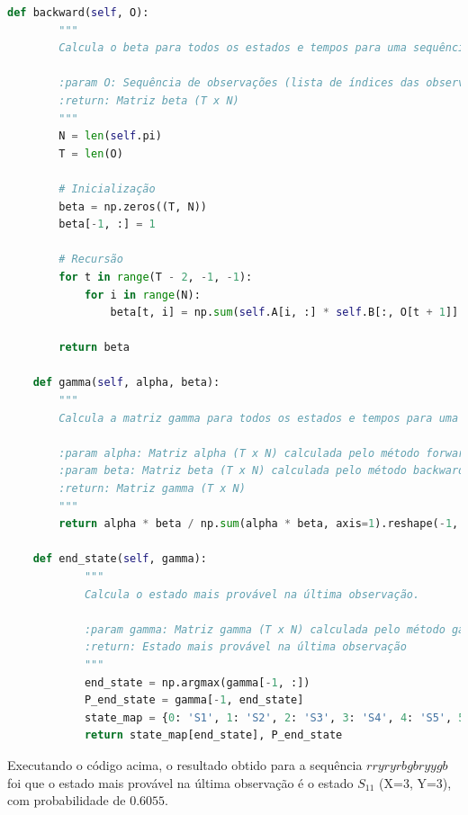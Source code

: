 \begin{itemize}
\begin{tcolorbox}[title=Resposta:]
    \end{tcolorbox}    
    
    \begin{lstlisting}[language=Python, caption={backward, gamma e end\_state}, label={lst:end_state}]
    def backward(self, O):
        """
        Calcula o beta para todos os estados e tempos para uma sequência O.

        :param O: Sequência de observações (lista de índices das observações)
        :return: Matriz beta (T x N)
        """
        N = len(self.pi)
        T = len(O)

        # Inicialização
        beta = np.zeros((T, N))
        beta[-1, :] = 1

        # Recursão
        for t in range(T - 2, -1, -1):
            for i in range(N):
                beta[t, i] = np.sum(self.A[i, :] * self.B[:, O[t + 1]] * beta[t + 1, :])

        return beta
    
    def gamma(self, alpha, beta):
        """
        Calcula a matriz gamma para todos os estados e tempos para uma sequência O.
        
        :param alpha: Matriz alpha (T x N) calculada pelo método forward
        :param beta: Matriz beta (T x N) calculada pelo método backward
        :return: Matriz gamma (T x N)
        """
        return alpha * beta / np.sum(alpha * beta, axis=1).reshape(-1, 1)

    def end_state(self, gamma):
            """
            Calcula o estado mais provável na última observação.
            
            :param gamma: Matriz gamma (T x N) calculada pelo método gamma
            :return: Estado mais provável na última observação
            """
            end_state = np.argmax(gamma[-1, :])
            P_end_state = gamma[-1, end_state]
            state_map = {0: 'S1', 1: 'S2', 2: 'S3', 3: 'S4', 4: 'S5', 5: 'S6', 6: 'S7', 7: 'S8', 8: 'S9', 9: 'S10', 10: 'S11', 11: 'S12', 12: 'S13', 13: 'S14', 14: 'S15', 15: 'S16'}
            return state_map[end_state], P_end_state        
    \end{lstlisting}

    \begin{tcolorbox}[title=Resposta (continuação):]
        Executando o código acima, o resultado obtido para a sequência \( r r y r y r b g b r y y g b \) foi que o estado mais provável na última observação é o estado \( S_{11} \) (X=3, Y=3), com probabilidade de $0.6055$.
    \end{tcolorbox}


\end{itemize}
